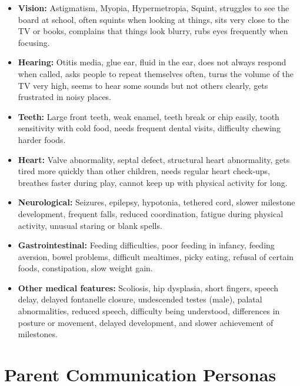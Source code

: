 \documentclass[ %
                    author={Aman Kumar Singh},
                supervisor={Dr. Edwin Simpson},
                    degree={MSc},
                     title={Quality-Aware Knowledge Distillation of Large Language Models for Efficient Personalised Clinical Report Generation},
                  subtitle={},
                      type={},
                      year={2021}]{dissertation}
\begin{document}
\begin{itemize}
    \item \textbf{Vision:} Astigmatism, Myopia, Hypermetropia, Squint,
    struggles to see the board at school, often squints when looking at things,
    sits very close to the TV or books, complains that things look blurry,
    rubs eyes frequently when focusing.

    \item \textbf{Hearing:} Otitis media, glue ear, fluid in the ear,
    does not always respond when called, asks people to repeat themselves
    often, turns the volume of the TV very high, seems to hear some sounds
    but not others clearly, gets frustrated in noisy places.

    \item \textbf{Teeth:} Large front teeth, weak enamel, teeth break or
    chip easily, tooth sensitivity with cold food, needs frequent dental
    visits, difficulty chewing harder foods.

    \item \textbf{Heart:} Valve abnormality, septal defect, structural
    heart abnormality, gets tired more quickly than other children, needs
    regular heart check-ups, breathes faster during play, cannot keep up
    with physical activity for long.

    \item \textbf{Neurological:} Seizures, epilepsy, hypotonia, tethered
    cord, slower milestone development, frequent falls, reduced coordination,
    fatigue during physical activity, unusual staring or blank spells.

    \item \textbf{Gastrointestinal:} Feeding difficulties, poor feeding in
    infancy, feeding aversion, bowel problems, difficult mealtimes, picky
    eating, refusal of certain foods, constipation, slow weight gain.

    \item \textbf{Other medical features:} Scoliosis, hip dysplasia, short
    fingers, speech delay, delayed fontanelle closure, undescended testes
    (male), palatal abnormalities, reduced speech, difficulty being
    understood, differences in posture or movement, delayed development,
    and slower achievement of milestones.
\end{itemize}

\section{Parent Communication Personas}
\end{document}
